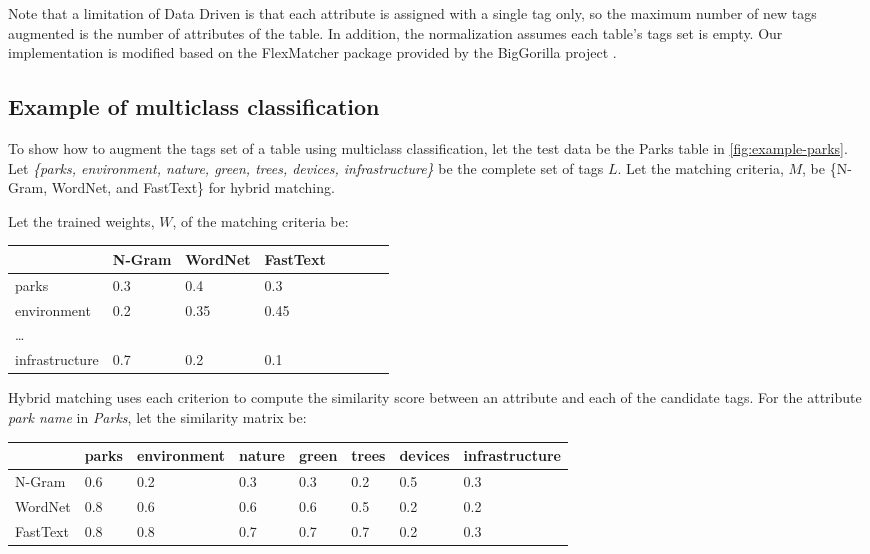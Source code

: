 Note that a limitation of Data Driven is that each attribute is assigned with a single tag only, so the maximum number of new tags augmented is the number of attributes of the table. In addition, the normalization assumes each table's tags set is empty. Our implementation is modified based on the FlexMatcher package provided by the BigGorilla project \cite{DBLP:journals/debu/ChenGHTD18}.

\subsection{Example of multiclass classification}

To show how to augment the tags set of a table using multiclass classification, let the test data be the Parks table in \autoref{fig:example-parks}. Let \textit{\{parks, environment, nature, green, trees, devices, infrastructure\}} be the complete set of tags $L$. Let the matching criteria, $M$, be \{N-Gram, WordNet, and FastText\} for hybrid matching.

Let the trained weights, $W$, of the matching criteria be:

\begin{table}[h!]
    \begin{center}
      \begin{tabular}{|l|l|l|l|l|l|l|l|}
        \hline        
        & \textbf{N-Gram} & \textbf{WordNet} & \textbf{FastText}\\
        \hline
        parks & 0.3 & 0.4 & 0.3 \\
        \hline
        environment & 0.2 & 0.35 & 0.45 \\
        \hline
        \dots &  &  &  \\
        \hline
        infrastructure & 0.7 & 0.2 & 0.1 \\
        \hline    
      \end{tabular}
    \end{center}
\end{table}

Hybrid matching uses each criterion to compute the similarity score between an attribute and each of the candidate tags. For the attribute \textit{park name} in \textit{Parks}, let the similarity matrix be:

\begin{table}[h!]
    \begin{center}
      \begin{tabular}{|l|l|l|l|l|l|l|l|}
        \hline
        & \textbf{parks} & \textbf{environment} & \textbf{nature} & \textbf{green} & \textbf{trees} & \textbf{devices} & \textbf{infrastructure}\\
        \hline
        N-Gram & 0.6 & 0.2 & 0.3 & 0.3 & 0.2 & 0.5 & 0.3 \\
        \hline
        WordNet & 0.8 & 0.6 & 0.6 & 0.6 & 0.5 & 0.2 & 0.2 \\
        \hline
        FastText & 0.8 & 0.8 & 0.7 & 0.7 & 0.7 & 0.2 & 0.3 \\
        \hline    
      \end{tabular}
    \end{center}
\end{table}

